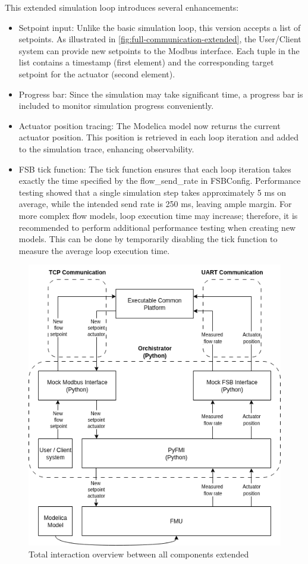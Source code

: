 \documentclass[we,final,11pt,oneside,openany]{uantwerpenbamathesis}
\begin{document}
This extended simulation loop introduces several enhancements:
\begin{itemize}
    \item Setpoint input: Unlike the basic simulation loop, this version accepts a list of setpoints. As illustrated in \autoref{fig:full-communication-extended}, the User/Client system can provide new setpoints to the Modbus interface. Each tuple in the list contains a timestamp (first element) and the corresponding target setpoint for the actuator (second element).
    \item Progress bar: Since the simulation may take significant time, a progress bar is included to monitor simulation progress conveniently.
    \item Actuator position tracing: The Modelica model now returns the current actuator position. This position is retrieved in each loop iteration and added to the simulation trace, enhancing observability.
    \item FSB tick function: The tick function ensures that each loop iteration takes exactly the time specified by the flow\_send\_rate in FSBConfig. Performance testing showed that a single simulation step takes approximately 5 ms on average, while the intended send rate is 250 ms, leaving ample margin. For more complex flow models, loop execution time may increase; therefore, it is recommended to perform additional performance testing when creating new models. This can be done by temporarily disabling the tick function to measure the average loop execution time.
\end{itemize}

\begin{figure}[h!]
    \centering
    \includegraphics[width=0.6\linewidth]{Images/generated/full-communication-extended}
    \caption{Total interaction overview between all components extended}
    \label{fig:full-communication-extended}
\end{figure}
\end{document}

